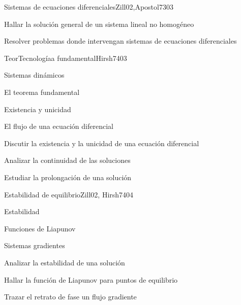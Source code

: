 \begin{syllabus}
\begin{unit}{Sistemas de ecuaciones diferenciales}{}{Zill02,Apostol73}{0}{3}
   \begin{learningoutcomes}
      \item Hallar la solución general de un sistema lineal no  homogéneo
      \item Resolver problemas donde intervengan sistemas de ecuaciones diferenciales
   \end{learningoutcomes}
\end{unit}

\begin{unit}{TeorTecnologíaa fundamental}{}{Hirsh74}{0}{3}
\begin{topics}
      \item Sistemas dinámicos
      \item El teorema fundamental
      \item Existencia y unicidad
      \item El flujo de una ecuación diferencial
   \end{topics}

   \begin{learningoutcomes}
      \item Discutir la existencia y la unicidad de una ecuación diferencial
      \item Analizar la continuidad de las soluciones
      \item Estudiar la prolongación de una solución

   \end{learningoutcomes}
\end{unit}

\begin{unit}{Estabilidad de equilibrio}{}{Zill02, Hirsh74}{0}{4}
\begin{topics}
      \item Estabilidad
      \item Funciones de Liapunov
      \item Sistemas gradientes
   \end{topics}

   \begin{learningoutcomes}
      \item Analizar la estabilidad de una solución
      \item Hallar la función de Liapunov para puntos de  equilibrio
      \item Trazar el retrato de fase un flujo gradiente
    \end{learningoutcomes}
\end{unit}

\begin{coursebibliography}
\end{coursebibliography}

\end{syllabus}
